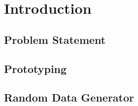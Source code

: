 \chapter{Introduction}\label{ch:introduction}

\section{Problem Statement}

\section{Prototyping}

\section{Random Data Generator}
